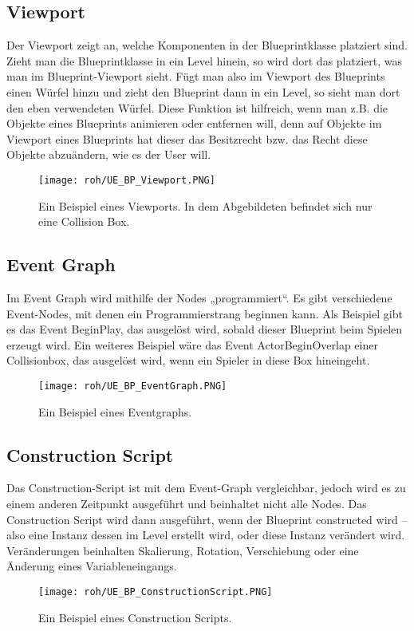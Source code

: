 \subsection{Viewport}
Der Viewport zeigt an, welche Komponenten in der Blueprintklasse platziert sind.
Zieht man die Blueprintklasse in ein Level hinein, so wird dort das platziert, was man im Blueprint-Viewport sieht.\citep{ue:BPViewport}
Fügt man also im Viewport des Blueprints einen Würfel hinzu und zieht den Blueprint dann in ein Level, so sieht man dort den eben verwendeten Würfel.
Diese Funktion ist hilfreich, wenn man z.B. die Objekte eines Blueprints animieren oder entfernen will, denn auf Objekte im Viewport eines Blueprints hat dieser das Besitzrecht bzw. das Recht diese Objekte abzuändern, wie es der User will.
\begin{figure}[H]
    \centering
    \texttt{[image: roh/UE\_BP\_Viewport.PNG]}
    \caption{Ein Beispiel eines Viewports. In dem Abgebildeten befindet sich nur eine Collision Box.}
    \label{UE:BP_Viewport}
\end{figure}
\subsection{Event Graph}
Im Event Graph wird mithilfe der Nodes „programmiert“.\citep{ue:BPEventGraph}
Es gibt verschiedene Event-Nodes, mit denen ein Programmierstrang beginnen kann.
Als Beispiel gibt es das Event BeginPlay, das ausgelöst wird, sobald dieser Blueprint beim Spielen erzeugt wird.
Ein weiteres Beispiel wäre das Event ActorBeginOverlap einer Collisionbox, das ausgelöst wird, wenn ein Spieler in diese Box hineingeht.
\begin{figure}[H]
    \centering
    \texttt{[image: roh/UE\_BP\_EventGraph.PNG]}
    \caption{Ein Beispiel eines Eventgraphs.}
    \label{UE:BP_EventGraph}
\end{figure}
\subsection{Construction Script}
Das Construction-Script ist mit dem Event-Graph vergleichbar, jedoch wird es zu einem anderen Zeitpunkt ausgeführt und beinhaltet nicht alle Nodes.\citep{ue:BPConScript}
Das Construction Script wird dann ausgeführt, wenn der Blueprint constructed wird – also eine Instanz dessen im Level erstellt wird, oder diese Instanz verändert wird.
Veränderungen beinhalten Skalierung, Rotation, Verschiebung oder eine Änderung eines Variableneingangs.
\begin{figure}[H]
    \centering
    \texttt{[image: roh/UE\_BP\_ConstructionScript.PNG]}
    \caption{Ein Beispiel eines Construction Scripts.}
    \label{UE:BP_ConstructionScript}
\end{figure}
